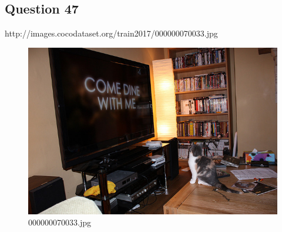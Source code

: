 \subsection*{Question 47}
http://images.cocodataset.org/train2017/000000070033.jpg
\begin{figure}[h]
    \centering
    \includegraphics[width=0.8\linewidth]{../image set/hard/000000070033.jpg}
    \caption{000000070033.jpg}
\end{figure}
